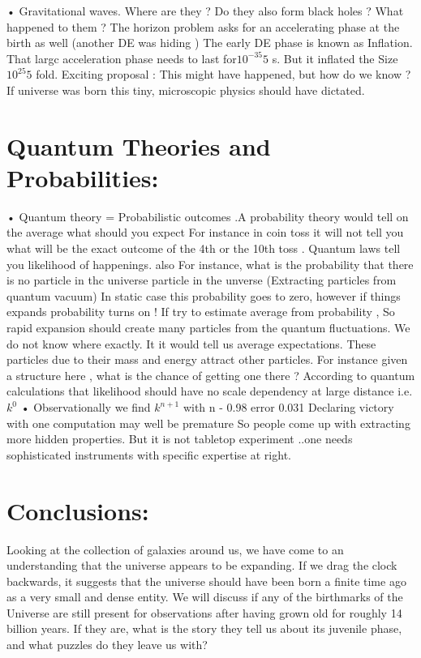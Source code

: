 \documentclass[10pt]{article}
\begin{document}
 
 • Gravitational waves. Where are they ? 
 Do they also form black holes ? What happened to them ?
The horizon problem asks for an accelerating phase at the birth as well (another DE was hiding ) 
 The early DE phase is known as Inflation. 
 That largc acceleration phase needs to last for$ 10^{-35}5$ s. But it inflated the Size $ 10^{25}5$ fold. 
 Exciting proposal : This might have happened, but how do we know ? If universe was born this tiny, microscopic physics should have dictated.

\section{Quantum Theories and Probabilities:}
 • Quantum theory = Probabilistic outcomes .A probability theory would tell on the average what should you expect 
 For instance in coin toss it will not tell you what will be the exact outcome of the 4th or the 10th 
 toss  . Quantum laws tell you likelihood of happenings. 
 also For instance, what is the probability that there is no particle in thc universe 
 particle in the unverse (Extracting particles from quantum vacuum) 
In static case this probability goes to zero, however if things expands probability turns on ! If try to estimate average from probability , So rapid expansion should create many particles from the quantum fluctuations. 
 We do not know where exactly. It it would tell us average expectations. 
 These particles due to their mass and energy attract other particles. 
  For instance given a structure here , what is the chance of getting one there ? According to 
 quantum calculations that likelihood should have no scale dependency at large distance i.e. $k^{0}$ 
 • Observationally we find $k^{n+1}$  with n - 0.98 {error 0.031}
  Declaring victory with one computation may well be premature 
  So people come up with extracting more hidden properties. 
  But it is not tabletop experiment ..one needs sophisticated instruments with specific expertise 
 at right.

 \section{Conclusions:}
 Looking at the collection of galaxies around us, we have come to an understanding that the universe appears to be expanding. If we drag the clock backwards, it suggests that the universe should have been born a finite time ago as a very small and dense entity. We will discuss if any of the birthmarks of the Universe are still present for observations after having grown old for roughly 14 billion years. If they are, what is the story they tell us about its juvenile phase, and what puzzles do they leave us with?
 
\end{document}
